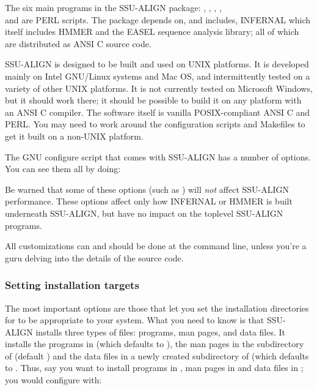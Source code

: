 The six main programs in the SSU-ALIGN package:
, , , ,\\
 and  are PERL scripts. The
package depends on, and includes, INFERNAL 
which itself includes HMMER and the EASEL sequence analysis
library; all of which are distributed as ANSI C source code. 

SSU-ALIGN is designed to be built and used on UNIX platforms. It
is developed mainly on Intel GNU/Linux systems and Mac OS, and
intermittently tested on a variety of other UNIX platforms. It is not
currently tested on Microsoft Windows, but it should work there; it
should be possible to build it on any platform with an ANSI C
compiler. The software itself is vanilla POSIX-compliant ANSI C and
PERL. You may need to work around the configuration scripts and
Makefiles to get it built on a non-UNIX platform.

The GNU configure script that comes with SSU-ALIGN has a
number of options. You can see them all by doing:


Be warned that some of these options (such as ) will
\emph{not} affect SSU-ALIGN performance. These options affect only how
INFERNAL or HMMER is built underneath SSU-ALIGN,
but have no impact on the toplevel SSU-ALIGN programs. 

All customizations can and should be done at the 
command line, unless you're a guru delving into the details of the
source code.

\subsubsection{Setting installation targets}

The most important options are those that let you set the installation
directories for  to be appropriate to your system.
What you need to know is that SSU-ALIGN installs three types
of files: programs, man pages, and data files. It installs the programs in
 (which defaults to ), the man pages in the
 subdirectory of  (default
) and the data files in a newly created
subdirectory  of  (which
defaults to . Thus, say you want
 to install programs in , man pages in
 and data files in ;
you would configure with:


